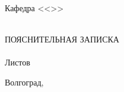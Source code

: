 {{{\hfill
{}\\
\newpage
}
\renewcommand{\VSTUDocumentCodeSuffix}{81}
\clearpage
\thispagestyle{empty}
\begin{center}
\VSTUTitleHeading
Кафедра <<\VSTUDepartment>>\\
\end{center}
\vfill
\hfill\VSTUTitleHeadApproval
\vspace{8mm}
\begin{center}
\VSTUTitle\\
\vspace{\fill}
ПОЯСНИТЕЛЬНАЯ ЗАПИСКА\\
\vspace{8mm}
\VSTUDocumentCode\\
\vspace{8mm}
Листов \totalpages\\
\vspace{\fill}
\end{center}
\begin{flushright}
\VSTUTitleDirector
\end{flushright}
\vspace{8mm}
\begin{flushleft}
\VSTUTitleStandardsAdviser
\hfill
\VSTUTitleImplementer
\end{flushleft}
\vspace{\fill}
\begin{center}
Волгоград,~\the\year
\end{center}
\newpage
}
}
